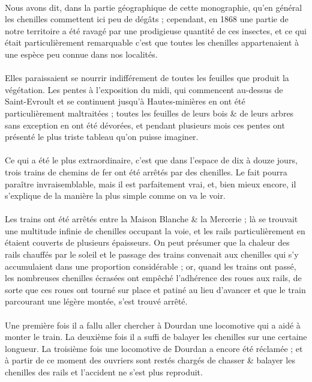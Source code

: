 \documentclass[../eBook.tex]{subfiles}
\begin{document}
      \paragraph{}Nous avons dit, dans la partie géographique de cette monographie, qu'en général les chenilles commettent ici peu de dégâts ; cependant, en 1868 une partie de notre territoire a été ravagé par une prodigieuse quantité de ces insectes, et ce qui était particulièrement remarquable c'est que toutes les chenilles appartenaient à une espèce peu connue dans nos localités.
      \paragraph{}Elles paraissaient se nourrir indifférement de toutes les feuilles que produit la végétation. Les pentes à l'exposition du midi, qui commencent au-dessus de Saint-Evroult et se continuent jusqu'à Hautes-minières en ont été particulièrement maltraitées ; toutes les feuilles de leurs bois \& de leurs arbres sans exception en ont été dévorées, et pendant plusieurs mois ces pentes ont présenté le plus triste tableau qu'on puisse imaginer.
      \paragraph{}Ce qui a été le plus extraordinaire, c'est que dans l'espace de dix à douze jours, trois trains de chemins de fer ont été arrêtés par des chenilles. Le fait pourra paraître invraisemblable, mais il est parfaitement vrai, et, bien mieux encore, il s'explique de la manière la plus simple comme on va le voir.
      \paragraph{}Les trains ont été arrêtés entre la Maison Blanche \& la Mercerie ; là se trouvait une multitude infinie de chenilles occupant la voie, et les rails particulièrement en étaient couverts de plusieurs épaisseurs. On peut présumer que la chaleur des rails chauffés par le soleil et le passage des trains convenait aux chenilles qui s'y accumulaient dans une proportion considérable ; or, quand les trains ont passé, les nombreuses chenilles écrasées ont empêché l'adhérence des roues aux rails, de sorte que ces roues ont tourné sur place et patiné au lieu d'avancer et que le train parcourant une légère montée, s'est trouvé arrêté.
      \paragraph{}Une première fois il a fallu aller chercher à Dourdan une locomotive qui a aidé à monter le train. La deuxième fois il a suffi de balayer les chenilles sur une certaine longueur. La troisième fois une locomotive de Dourdan a encore été réclamée ; et à partir de ce moment des ouvriers sont restés chargés de chasser \& balayer les chenilles des rails et l'accident ne s'est plus reproduit.
\end{document}
